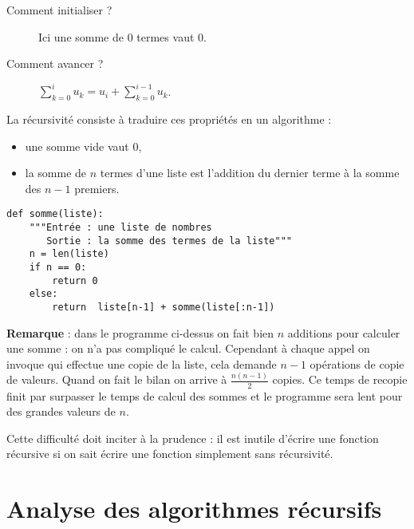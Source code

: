 \begin{description}
  \item[Comment initialiser ?] Ici une somme de 0 termes vaut 0.
  \item[Comment avancer ?] $\displaystyle \sum_{k=0}^i u_k = u_i + \sum_{k=0}^{i-1} u_k$.
\end{description} 
  
\medskip

La récursivité consiste à traduire ces propriétés en un algorithme : 
\begin{itemize}
  \item une somme vide vaut 0,

\item la somme de $n$ termes d'une liste est l'addition du dernier terme à la somme des $n-1$ premiers.
\end{itemize}
\begin{lstlisting}
def somme(liste):
    """Entrée : une liste de nombres
       Sortie : la somme des termes de la liste"""
    n = len(liste)
    if n == 0:
        return 0
    else:
        return  liste[n-1] + somme(liste[:n-1])
\end{lstlisting}
{\bf Remarque} : dans le programme ci-dessus on fait bien $n$ additions pour calculer une somme : on n'a pas compliqué le calcul.
Cependant à chaque appel on invoque  qui effectue une copie de la liste, cela demande $n-1$ opérations de copie de valeurs. Quand on fait le bilan on arrive à $\frac {n(n-1)}2$ copies. Ce temps de recopie finit par surpasser le temps de calcul des sommes et le programme sera lent pour des grandes valeurs de $n$.

Cette difficulté doit inciter à la prudence : il est inutile d'écrire une fonction récursive si on sait écrire une fonction simplement sans récursivité.
\section{Analyse des algorithmes récursifs}
